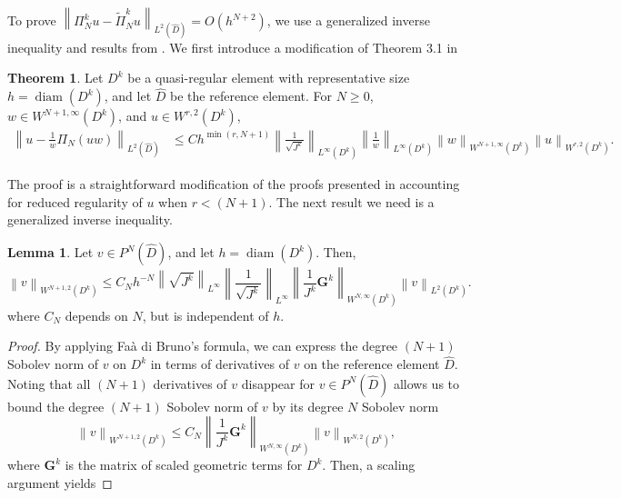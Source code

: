 \documentclass[10pt]{amsart}
\theoremstyle{definition}
\theoremstyle{lemma}
\newtheorem{lemma}{Lemma}
\theoremstyle{theorem}
\newtheorem{theorem}{Theorem}
\theoremstyle{assumption}
\DeclareMathOperator{\diam}{diam}
\renewcommand{\hat}{\widehat}
\renewcommand{\tilde}{\widetilde}
\newcommand{\nor}[1]{\left\| #1 \right\|}
\newcommand{\LRp}[1]{\left( #1 \right)}
\begin{document}
{To prove $\nor{\Pi_N^k u - \tilde{\Pi}^k_N  u}_{L^2\LRp{\hat{D}}} = O(h^{N+2})$, we use a generalized inverse inequality and results from \cite{chan2016weight1,chan2016weight2}.  We first introduce a modification of Theorem 3.1 in \cite{warburton2013low, chan2016weight1}
\begin{theorem}%
Let $D^k$ be a quasi-regular element with representative size $h = \diam\LRp{D^k}$, and let $\hat{D}$ be the reference element.  For $N \geq 0$, $w\in W^{N+1,\infty}\LRp{D^k}$, and $u\in W^{r,2}\LRp{D^k}$, 
\begin{align*}
\nor{u - \frac{1}{w} \Pi_N\LRp{{u}{w}}}_{L^2\LRp{\hat{D}}} &\leq C h^{\min\LRp{r,N+1}} \nor{\frac{1}{\sqrt{J^k}}}_{L^{\infty}\LRp{D^k}}\nor{\frac{1}{w}}_{L^{\infty}\LRp{D^k}} \nor{w}_{W^{N+1,\infty}\LRp{D^k}} \nor{u}_{W^{r,2}\LRp{D^k}}.
\end{align*}
\label{thm:wproj}
\end{theorem}
The proof is a straightforward modification of the proofs presented in \cite{warburton2013low, chan2016weight1} accounting for reduced regularity of $u$ when $r < (N+1)$.  The next result we need is a generalized inverse inequality.  
\begin{lemma}
\label{lemma:sobolev}
Let $v \in P^N\LRp{\hat{D}}$, and let $h = \diam\LRp{D^k}$.  Then,
\[
  \nor{v}_{W^{N+1,2}\LRp{D^k}} \leq C_{N}  h^{-N} \nor{\sqrt{J^k}}_{L^{\infty}} \nor{\frac{1}{\sqrt{J^k}}}_{L^{\infty}} \nor{\frac{1}{J^k}\bm{G}^k}_{W^{N,\infty}\LRp{D^k}} \nor{v}_{L^2\LRp{D^k}}.
\]
where $C_{N}$ depends on $N$, but is independent of $h$.
\end{lemma}
\begin{proof}
  By applying Fa\`{a} di Bruno's formula, we can express the degree $(N+1)$ Sobolev norm of $v$ on $D^k$ in terms of derivatives of $v$ on the reference element $\hat{D}$.  Noting that all $(N+1)$ derivatives of $v$ disappear for $v\in P^N\LRp{\hat{D}}$ allows us to bound the degree $(N+1)$ Sobolev norm of $v$ by its degree $N$ Sobolev norm
\[
  \nor{v}_{W^{N+1,2}\LRp{D^k}} \leq C_N \nor{\frac{1}{J^k}\bm{G}^k}_{W^{N,\infty}\LRp{D^k}} \nor{v}_{W^{N,2}\LRp{D^k}},
\]
where $\bm{G}^k$ is the matrix of scaled geometric terms for $D^k$.  Then, a scaling argument \cite{ciarlet1978finite, brenner2007mathematical} yields

\end{proof}}
\end{document}
